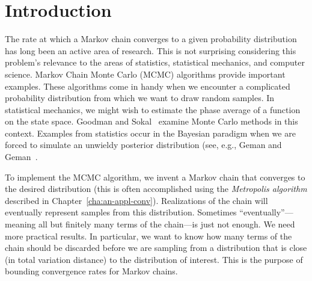 \documentclass[12pt,letterpaper]{report}
\theoremstyle{plain}
\theoremstyle{definition}
\theoremstyle{remark}
\numberwithin{theorem}{chapter}
\numberwithin{claim}{chapter}
\numberwithin{equation}{chapter}
\numberwithin{conjecture}{chapter}
\newcommand\<{\ensuremath{\langle}}
\renewcommand\>{\ensuremath{\rangle}}
\begin{document}


\section*{Introduction}
The rate at which a Markov chain converges to a given probability distribution
has long been an active area of research. This is not surprising considering
this problem's relevance to the areas of statistics, statistical mechanics, and
computer science. Markov Chain Monte Carlo (MCMC) algorithms provide important
examples. These algorithms come in handy when we encounter a complicated
probability distribution from which we want to draw random samples. In
statistical mechanics, we might wish to estimate the phase average of a function
on the state space. Goodman and Sokal~\cite{GoodmanSokal:1989} examine Monte
Carlo methods in this context. Examples from statistics occur in the Bayesian
paradigm when we are forced to simulate an unwieldy posterior distribution (see,
e.g., Geman and Geman~\cite{Geman:1984}.  

To implement the MCMC algorithm, we invent a Markov chain that converges to the
desired distribution (this is often accomplished using the \emph{Metropolis algorithm}
described in Chapter~\ref{cha:an-appl-conv}). Realizations of the chain will
eventually represent samples from this distribution. Sometimes
``eventually''---meaning all but finitely many terms of the chain---is just not 
enough. We need more practical results. In particular, we want to know how many
terms of the chain should be discarded before we are sampling from a
distribution that is close (in total variation distance) to 
%
%
%
%
the distribution of interest. This is the purpose of bounding convergence rates
for Markov chains. 
\end{document}
